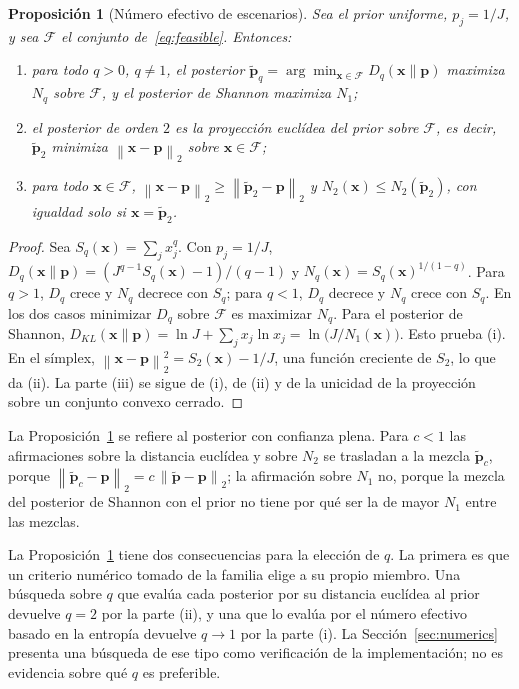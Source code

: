 \documentclass[11pt]{article}
\newtheorem{proposition}{Proposici\'on}
\newcommand{\p}{\mathbf{p}}
\newcommand{\pt}{\tilde{\mathbf{p}}}
\newcommand{\x}{\mathbf{x}}
\newcommand{\norm}[1]{\left\lVert #1 \right\rVert}
\begin{document}
\begin{proposition}[N\'umero efectivo de escenarios]\label{prop:hill}
Sea el prior uniforme, $p_j = 1/J$, y sea $\mathcal{F}$ el conjunto
de~\eqref{eq:feasible}. Entonces:
\begin{enumerate}
\item[(i)] para todo $q>0$, $q \ne 1$, el posterior
      $\pt_q = \arg\min_{\x \in \mathcal{F}} D_q(\x\|\p)$ maximiza $N_q$
      sobre $\mathcal{F}$, y el posterior de Shannon maximiza $N_1$;
\item[(ii)] el posterior de orden $2$ es la proyecci\'on eucl\'idea del
      prior sobre $\mathcal{F}$, es decir,
      $\pt_2$ minimiza $\norm{\x - \p}_2$ sobre $\x \in \mathcal{F}$;
\item[(iii)] para todo $\x \in \mathcal{F}$,
      $\norm{\x - \p}_2 \ge \norm{\pt_2 - \p}_2$ y
      $N_2(\x) \le N_2(\pt_2)$, con igualdad solo si $\x = \pt_2$.
\end{enumerate}
\end{proposition}

\begin{proof}
Sea $S_q(\x) = \sum_j x_j^q$. Con $p_j = 1/J$,
$D_q(\x\|\p) = (J^{q-1} S_q(\x) - 1)/(q-1)$ y
$N_q(\x) = S_q(\x)^{1/(1-q)}$. Para $q>1$, $D_q$ crece y $N_q$ decrece con
$S_q$; para $q<1$, $D_q$ decrece y $N_q$ crece con $S_q$. En los dos casos
minimizar $D_q$ sobre $\mathcal{F}$ es maximizar $N_q$. Para el posterior
de Shannon,
$D_{KL}(\x\|\p) = \ln J + \sum_j x_j \ln x_j = \ln\big(J/N_1(\x)\big)$.
Esto prueba (i). En el s\'implex,
$\norm{\x-\p}_2^2 = S_2(\x) - 1/J$, una funci\'on creciente de $S_2$, lo que
da (ii). La parte (iii) se sigue de (i), de (ii) y de la unicidad de la
proyecci\'on sobre un conjunto convexo cerrado.
\end{proof}

La Proposici\'on~\ref{prop:hill} se refiere al posterior con confianza
plena. Para $c<1$ las afirmaciones sobre la distancia eucl\'idea y sobre
$N_2$ se trasladan a la mezcla $\pt_c$, porque
$\norm{\pt_c - \p}_2 = c\,\norm{\pt - \p}_2$; la afirmaci\'on sobre $N_1$
no, porque la mezcla del posterior de Shannon con el prior no tiene por qu\'e
ser la de mayor $N_1$ entre las mezclas.

La Proposici\'on~\ref{prop:hill} tiene dos consecuencias para la elecci\'on de
$q$. La primera es que un criterio num\'erico tomado de la familia elige a su
propio miembro. Una b\'usqueda sobre $q$ que eval\'ua cada posterior por su
distancia eucl\'idea al prior devuelve $q=2$ por la parte (ii), y una que
lo eval\'ua por el n\'umero efectivo basado en la entrop\'ia devuelve $q \to 1$ por
la parte (i). La Secci\'on~\ref{sec:numerics} presenta una b\'usqueda de ese
tipo como verificaci\'on de la implementaci\'on; no es evidencia sobre qu\'e
$q$ es preferible.
\end{document}
